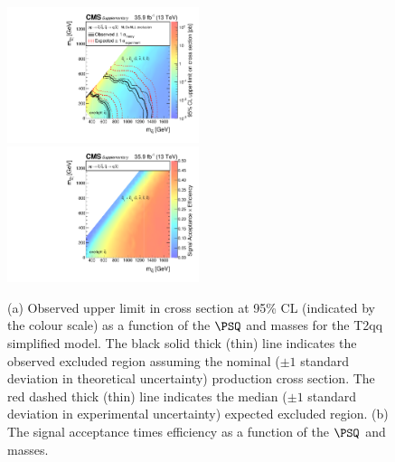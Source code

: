 \begin{figure}
    \begin{center}
            \includegraphics[width=0.50\textwidth]{Supplementary/T2qqXSEC}
            \includegraphics[width=0.50\textwidth]{Supplementary/T2qq_efficiency_aux}
        \caption{ (a) Observed upper limit in cross section at 95\% CL (indicated
        by the colour scale) as a function of 
        the $\PSQ$ and \PSGczDo %
        masses for the 
        T2qq %
        simplified  model.  The  black  solid thick  (thin)  line indicates  the
        observed  excluded  region  assuming   the  nominal  (${\pm}1$  standard
        deviation in theoretical uncertainty)  production cross section. The red
        dashed  thick  (thin)  line  indicates  the  median  (${\pm}1$  standard
        deviation in experimental uncertainty) expected excluded region.
        (b) The signal acceptance times efficiency as a function of 
        the $\PSQ$ and \PSGczDo %
        masses.
        }
        \label{fig:T2qq}
    \end{center}
\end{figure}

